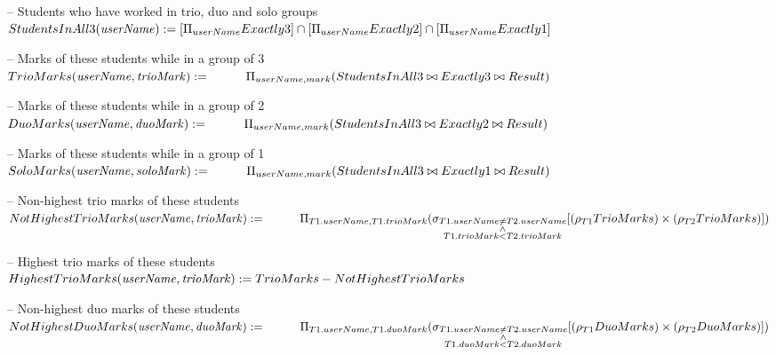\documentclass{article}
\newcommand{\var}[1]{\mathit{#1}}
\begin{document}
\begin{enumerate}
{-- Students who have worked in trio, duo and solo groups \\[5pt]
$
StudentsInAll3(\var{userName}) :=
    [\Pi_{userName}Exactly3] \cap [\Pi_{userName}Exactly2] \cap [\Pi_{userName}Exactly1] \\[10pt]
$

-- Marks of these students while in a group of 3 \\[5pt]
$
TrioMarks(\var{userName, trioMark}) := \\[5pt]
    \hspace*{1cm}
    \Pi_{userName, mark}
    (StudentsInAll3 \bowtie Exactly3 \bowtie Result) \\[10pt]
$

-- Marks of these students while in a group of 2 \\[5pt]
$
DuoMarks(\var{userName, duoMark}) := \\[5pt]
    \hspace*{1cm}
    \Pi_{userName, mark}
    (StudentsInAll3 \bowtie Exactly2 \bowtie Result) \\[10pt]
$

-- Marks of these students while in a group of 1 \\[5pt]
$
SoloMarks(\var{userName, soloMark}) := \\[5pt]
    \hspace*{1cm}
    \Pi_{userName, mark}
    (StudentsInAll3 \bowtie Exactly1 \bowtie Result) \\[10pt]
$

\newpage

-- Non-highest trio marks of these students \\[5pt]
$
NotHighestTrioMarks(\var{userName, trioMark}) := \\[5pt]
    \hspace*{1cm}
    \Pi_{T1.userName, T1.trioMark}
    (\sigma_{\substack{T1.userName \neq T2.userName \\ \wedge \\ T1.trioMark < T2.trioMark}}
    [(\rho_{T1}TrioMarks) \times (\rho_{T2}TrioMarks)]) \\[10pt]
$

-- Highest trio marks of these students \\[5pt]
$
HighestTrioMarks(\var{userName, trioMark}) :=
    TrioMarks - NotHighestTrioMarks \\[10pt]
$

-- Non-highest duo marks of these students \\[5pt]
$
NotHighestDuoMarks(\var{userName, duoMark}) := \\[5pt]
    \hspace*{1cm}
    \Pi_{T1.userName, T1.duoMark}
    (\sigma_{\substack{T1.userName \neq T2.userName \\ \wedge \\ T1.duoMark < T2.duoMark}}
    [(\rho_{T1}DuoMarks) \times (\rho_{T2}DuoMarks)]) \\[10pt]
$

}
\end{enumerate}
\end{document}
